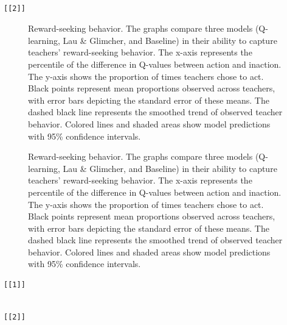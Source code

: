 \documentclass[
  number,
  preprint,
  3p,
  onecolumn]{elsarticle}
\begin{document}
\begin{verbatim}

[[2]]
\end{verbatim}

\begin{figure}


\caption{\label{fig-reward-seeking-1}Reward-seeking behavior. The graphs
compare three models (Q-learning, Lau \& Glimcher, and Baseline) in
their ability to capture teachers' reward-seeking behavior. The x-axis
represents the percentile of the difference in Q-values between action
and inaction. The y-axis shows the proportion of times teachers chose to
act. Black points represent mean proportions observed across teachers,
with error bars depicting the standard error of these means. The dashed
black line represents the smoothed trend of observed teacher behavior.
Colored lines and shaded areas show model predictions with 95\%
confidence intervals.}

\end{figure}%

\begin{figure}


\caption{\label{fig-reward-seeking-2}Reward-seeking behavior. The graphs
compare three models (Q-learning, Lau \& Glimcher, and Baseline) in
their ability to capture teachers' reward-seeking behavior. The x-axis
represents the percentile of the difference in Q-values between action
and inaction. The y-axis shows the proportion of times teachers chose to
act. Black points represent mean proportions observed across teachers,
with error bars depicting the standard error of these means. The dashed
black line represents the smoothed trend of observed teacher behavior.
Colored lines and shaded areas show model predictions with 95\%
confidence intervals.}

\end{figure}%

\begin{verbatim}
[[1]]
\end{verbatim}

\begin{verbatim}

[[2]]
\end{verbatim}
\end{document}
